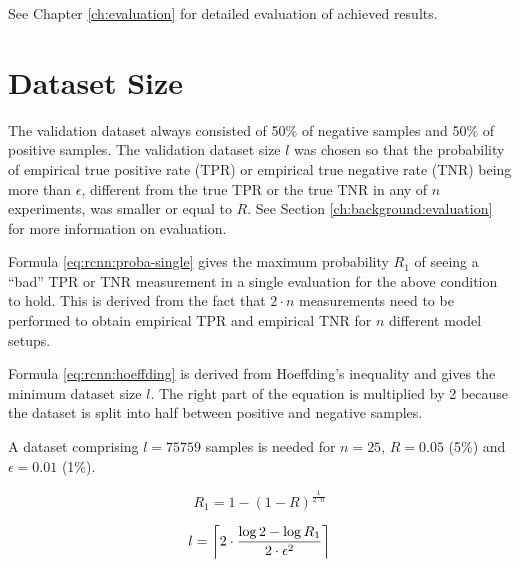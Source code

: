 See Chapter \ref{ch:evaluation} for detailed evaluation of achieved results.

\section{\label{ch:rcnn:dataset-size}Dataset Size}

The validation dataset always consisted of 50\% of negative samples and 50\% of
positive samples. The validation dataset size $l$ was chosen so that the
probability of empirical true positive rate (TPR) or empirical true negative
rate (TNR) being more than $\epsilon$, different from the true TPR or the true
TNR in any of $n$ experiments, was smaller or equal to $R$. See Section
\ref{ch:background:evaluation} for more information on evaluation.

Formula \ref{eq:rcnn:proba-single} gives the maximum probability $R_1$ of
seeing a “bad” TPR or TNR measurement in a single evaluation for the above
condition to hold. This is derived from the fact that $2 \cdot n$ measurements
need to be performed to obtain empirical TPR and empirical TNR for $n$
different model setups.

Formula \ref{eq:rcnn:hoeffding} is derived from Hoeffding's inequality
\cite{hoeffding1994probability} and gives the minimum dataset size $l$. The
right part of the equation is multiplied by 2 because the dataset is split into
half between positive and negative samples.

A dataset comprising $l = 75759$ samples is needed for $n = 25$, $R = 0.05$
(5\%) and $\epsilon = 0.01$ (1\%).

\begin{equation}
  R_1 = 1 - (1 - R)^\frac{1}{2 \cdot n}
  \label{eq:rcnn:proba-single}
\end{equation}

\begin{equation}
  l = \ceil*{2 \cdot \frac{\log 2 - \log R_1}{2 \cdot \epsilon^2}}
  \label{eq:rcnn:hoeffding}
\end{equation}
